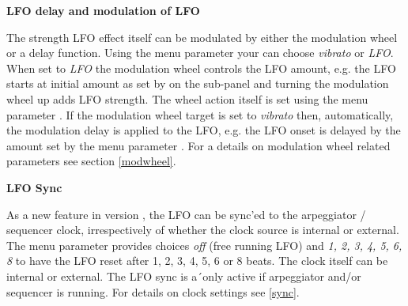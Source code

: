 \textbf{LFO delay and modulation of LFO}

The strength LFO effect itself can be modulated by either the modulation wheel or a delay function. Using the menu parameter \modwheeltarget your can choose \textit{vibrato} or \textit{LFO}. When set to \textit{LFO} the modulation wheel controls the LFO amount, e.g. the LFO starts at initial amount as set by \lfoamt on the sub-panel and turning the modulation wheel up adds LFO strength. The wheel action itself is set using the menu parameter \modwheelrange. If the modulation wheel target is set to \textit{vibrato} then, automatically, the modulation delay is applied to the LFO, e.g. the LFO onset is delayed by the amount set by the menu parameter \moddelay. For a details on modulation wheel related parameters see section \ref{modwheel}.

\textbf{LFO Sync}

As a new feature in version \version, the LFO can be sync'ed to the arpeggiator / sequencer clock, irrespectively of whether the clock source is internal or external. The menu parameter \lfosync provides choices \textit{off} (free running LFO) and \textit{1, 2, 3, 4, 5, 6, 8} to have the LFO reset after 1, 2, 3, 4, 5, 6 or 8 beats. The clock itself can be internal or external. The LFO sync is a´only active if arpeggiator and/or sequencer is running. For details on clock settings see \ref{sync}.
